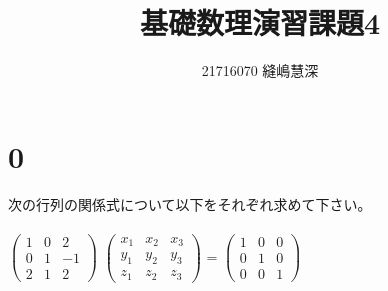\documentclass[fleqn]{jsarticle}
\title{基礎数理演習課題4}
\author{21716070 縫嶋慧深}
\begin{document}
	\maketitle

    \section*{0}
    次の行列の関係式について以下をそれぞれ求めて下さい。\\\\
    $ \begin{pmatrix}
        1 & 0 & 2 \\
        0 & 1 & -1 \\
        2 & 1 & 2
    \end{pmatrix} $
    $ \begin{pmatrix}
        x_1 & x_2 & x_3 \\
        y_1 & y_2 & y_3 \\
        z_1 & z_2 & z_3
    \end{pmatrix} $
    =
    $ \begin{pmatrix}
        1 & 0 & 0 \\
        0 & 1 & 0 \\
        0 & 0 & 1
    \end{pmatrix} $\\\\
\end{document}
